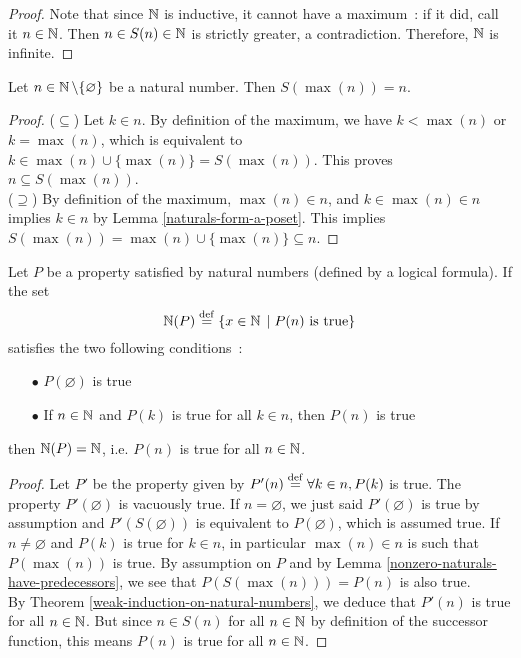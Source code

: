 \begin{proof}
    Note that since $\operatorname{\mathbb N}$ is inductive, it cannot have a maximum~: if it did, call it $n \in \operatorname{\mathbb N}$. Then $n \in S(n) \in \operatorname{\mathbb N}$ is strictly greater, a contradiction. Therefore, $\operatorname{\mathbb N}$ is infinite.
 \end{proof}

\begin{lemma} \label{nonzero-naturals-have-predecessors}
    Let $n \in \operatorname{\mathbb N} \setminus \{\varnothing\}$ be a natural number. Then $S(\max{(n)}) = n$.
\end{lemma}

\begin{proof}
    ($\subseteq$) Let $k \in n$. By definition of the maximum, we have $k < \max{(n)}$ or $k = \max{(n)}$, which is equivalent to $k \in \max{(n)} \cup \{\max{(n)}\} = S(\max{(n)})$. This proves $n \subseteq S(\max{(n)})$.
    \\
    
    ($\supseteq$) By definition of the maximum, $\max{(n)} \in n$, and $k \in \max{(n)} \in n$ implies $k \in n$ by Lemma \autoref{naturals-form-a-poset}. This implies $S(\max{(n)}) = \max{(n)} \cup \{\max{(n)}\} \subseteq n$.
\end{proof}

\begin{corollary} \label{strong-induction-on-natural-numbers}
    Let $P$ be a property satisfied by natural numbers (defined by a logical formula). If the set 
    \[
        \operatorname{\mathbb N}(P) \overset{\mathrm{def}}{=} \{ x \in \operatorname{\mathbb N} \, \mid P(n) \text{ is true} \}    
    \]
    satisfies the two following conditions~:
    \begin{itemize}
        \item[$\bullet$] $P(\varnothing)$ is true
        \item[$\bullet$] If $n \in \operatorname{\mathbb N}$ and $P(k)$ is true for all $k \in n$, then $P(n)$ is true
    \end{itemize}
    then $\operatorname{\mathbb N}(P) = \operatorname{\mathbb N}$, i.e. $P(n)$ is true for all $n \in \operatorname{\mathbb N}$.
\end{corollary}

\begin{proof}
    Let $P'$ be the property given by $P'(n) \overset{\mathrm{def}}{=} \forall k \in n, P(k)$ is true. The property $P'(\varnothing)$ is vacuously true. If $n = \varnothing$, we just said $P'(\varnothing)$ is true by assumption and $P'(S(\varnothing))$ is equivalent to $P(\varnothing)$, which is assumed true. If $n \neq \varnothing$ and $P(k)$ is true for $k \in n$, in particular $\max{(n)} \in n$ is such that $P(\max{(n)})$ is true. By assumption on $P$ and by Lemma \autoref{nonzero-naturals-have-predecessors}, we see that $P(S(\max{(n)})) = P(n)$ is also true.
    \\

    By Theorem \autoref{weak-induction-on-natural-numbers}, we deduce that $P'(n)$ is true for all $n \in \operatorname{\mathbb N}$. But since $n \in S(n)$ for all $n \in \operatorname{\mathbb N}$ by definition of the successor function, this means $P(n)$ is true for all $n \in \operatorname{\mathbb N}$. 
\end{proof}

